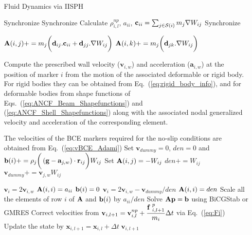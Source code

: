 \begin{algorithm}
	\caption{Fluid Dynamics via IISPH}
	{\fontsize{10}{10}\selectfont
		\begin{algorithmic}[1]
			  \ENDFOR
			\STATE	Synchronize
			  \ENDFOR
			\STATE	Synchronize
			\STATE Calculate $\rho_{i,l}^{np}$, $a_{ii}$, \AND   $\mathbf{c}_{ii}=\sum_{j \in {\cal S}(i)} m_j \nabla W_{ij}$
			\ENDFOR
			\STATE	Synchronize
			
			\STATE  ${\bf A}(i,j)+=m_j  \bigg( \mathbf{d}_{ij}.\mathbf{c}_{ii} + \mathbf{d}_{jj}. \nabla W_{ij} \bigg)$
			\STATE  ${\bf A}(i,k)+=m_j  \bigg(  \mathbf{d}_{jk}. \nabla W_{ij} \bigg)$
			\ENDFOR
			\ENDFOR
			\ENDIF
			\ENDFOR
			
			\STATE Compute the prescribed wall velocity ($\mathbf{v}_{i,w}$) and acceleration ($\mathbf{a}_{i,w}$) at the position of marker $i$ from the motion of the associated deformable or rigid body. For rigid bodies they can be obtained from Eq.~(\ref{eq:rigid_body_info}), and for deformable bodies from shape functions of Eqs.~(\ref{eq:ANCF_Beam_Shapefunctions}) and (\ref{eq:ANCF_Shell_Shapefunctions}) along with the associated nodal generalized velocity and acceleration of the  corresponding element.
			
			\STATE The velocities of the BCE markers required for the no-slip conditions are obtained  from Eq.~(\ref{eq:vBCE_Adami})
			\STATE  Set $\mathbf{v}_{dummy}=0$, $den=0$ and  
			\STATE ${\bf b}(i)+=\rho_j \bigg(\left( \mathbf{g} - \mathbf{a}_{j,w} \right) \cdot \mathbf{r}_{ij}\bigg) W_{ij}$
			\STATE Set ${\bf A}(i,j)=-W_{ij}$
			\STATE $den+=W_{ij}$ \AND $\mathbf{v}_{dummy}+=\mathbf{v}_{j,w} W_{ij}$
			\ENDFOR
			
			\STATE $\mathbf{v}_{i}=2\mathbf{v}_{i,w}$
			\STATE ${\bf A}(i,i)=a_{ii}$ \AND ${\bf b}(i)=0$
			\ELSE
			\STATE $\mathbf{v}_{i}=2\mathbf{v}_{i,w}-\mathbf{v}_{dummy}/den$
			\STATE ${\bf A}(i,i)=den$
			\STATE Scale all the elements of row $i$ of ${\bf A}$ and ${\bf b}(i)$ by $a_{ii}/den$ 
			\ENDIF
			\ENDFOR		
			\STATE Solve ${\bf A}{\bf p}={\bf b}$ using BiCGStab or GMRES
			\STATE Correct velocities from $\mathbf{v}_{i,l+1}=\mathbf{v}_{i,l}^{np}+ \dfrac{{\bf f}\;^{p}_{i,l+1}}{ m_i}\Delta t$ via Eq.~(\ref{eq:Fi})
			\STATE Update the state by $\mathbf{x}_{i,l+1}=\mathbf{x}_{i,l}+ \Delta t \; \mathbf{v}_{i,l+1}$
			\ENDFOR
		\end{algorithmic}\label{al:A_Matrix}
	}
\end{algorithm}
